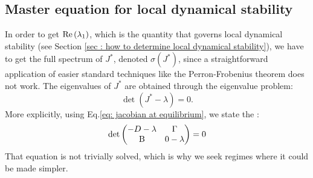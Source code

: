 \documentclass[12pt, titlepage]{report}
\begin{document}
\subsection{Master equation for local dynamical stability}\label{sec : establish master equation for dynamical stability}
In order to get $\text{Re}\left(\lambda_1\right)$, which is the quantity that governs local dynamical stability (see Section \ref{sec : how to determine local dynamical stability}), we have to get the full spectrum of $J^*$, denoted $\sigma(J^*)$, since a straightforward application of easier standard techniques like the Perron-Frobenius theorem \cite{perron_zur_1907} does not work. The eigenvalues of $J^*$ are obtained through the eigenvalue problem:
\begin{equation}
\det\left(J^* - \lambda \right) = 0.
\end{equation}
More explicitly, using Eq.\eqref{eq: jacobian at equilibrium}, we state the :
\begin{equation}
{
\det
\begin{pmatrix}
 -D - \lambda  & \Gamma \\
 \text{B}& 0-\lambda
\end{pmatrix} = 0
}
\end{equation}
That equation is not trivially solved, which is why we seek regimes where it could be made simpler.
\end{document}

